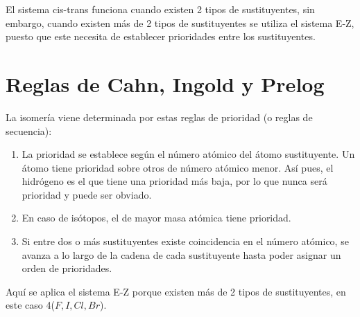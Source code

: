 El sistema cis-trans funciona cuando existen 2 tipos de sustituyentes, sin embargo, cuando existen más de 2 tipos de sustituyentes se utiliza el sistema E-Z, puesto que este necesita de establecer prioridades entre los sustituyentes.

    

\section{Reglas de Cahn, Ingold y Prelog}

La isomería viene determinada por estas reglas de prioridad (o reglas de secuencia):

\begin{enumerate}
    \item La prioridad se establece según el número atómico del átomo sustituyente. Un átomo tiene prioridad sobre otros de número atómico menor. Así pues, el hidrógeno es el que tiene una prioridad más baja, por lo que nunca será prioridad y puede ser obviado.
    \item En caso de isótopos, el de mayor masa atómica tiene prioridad.
    \item Si entre dos o más sustituyentes existe coincidencia en el número atómico, se avanza a lo largo de la cadena de cada sustituyente hasta poder asignar un orden de prioridades.
\end{enumerate}


Aquí se aplica el sistema E-Z porque existen más de 2 tipos de sustituyentes, en este caso 4($F, I, Cl, Br$).